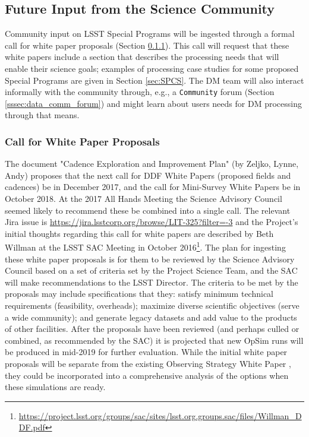 \documentclass[DM,lsstdraft,toc]{lsstdoc}
\begin{document}
\subsection{Future Input from the Science Community} \label{ssec:data_comm}

Community input on LSST Special Programs will be ingested through a formal call for white paper proposals (Section \ref{sssec:data_comm_call}). This call will request that these white papers include a section that describes the processing needs that will enable their science goals; examples of processing case studies for some proposed Special Programs are given in Section \ref{sec:SPCS}. The DM team will also interact informally with the community through, e.g., a \texttt{\Large{Community}} forum (Section \ref{sssec:data_comm_forum}) and might learn about users needs for DM processing through that means.

\subsubsection{Call for White Paper Proposals}\label{sssec:data_comm_call}

The document "Cadence Exploration and Improvement Plan" (by Zeljko, Lynne, Andy) proposes that the next call for DDF White Papers (proposed fields and cadences) be in December 2017, and the call for Mini-Survey White Papers be in October 2018. At the 2017 All Hands Meeting the Science Advisory Council seemed likely to recommend these be combined into a single call. The relevant Jira issue is \url{https://jira.lsstcorp.org/browse/LIT-325?filter=-3} and the Project's initial thoughts regarding this call for white papers are described by Beth Willman at the LSST SAC Meeting in October 2016\footnote{\url{https://project.lsst.org/groups/sac/sites/lsst.org.groups.sac/files/Willman_DDF.pdf}}. The plan for ingesting these white paper proposals is for them to be reviewed by the Science Advisory Council based on a set of criteria set by the Project Science Team, and the SAC will make recommendations to the LSST Director. The criteria to be met by the proposals may include specifications that they: satisfy minimum technical requirements (feasibility, overheads); maximize diverse scientific objectives (serve a wide community); and generate legacy datasets and add value to the products of other facilities. After the proposals have been reviewed (and perhaps culled or combined, as recommended by the SAC) it is projected that new OpSim runs will be produced in mid-2019 for further evaluation. While the initial white paper proposals will be separate from the existing Observing Strategy White Paper \citep{2017arXiv170804058L}, they could be incorporated into a comprehensive analysis of the options when these simulations are ready.
\end{document}
